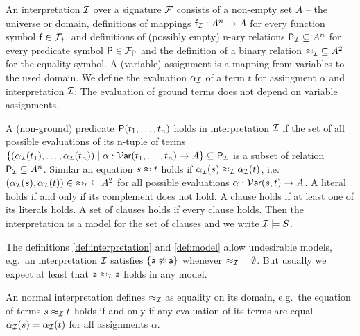 \begin{definition}\label{def:interpretation}
	An {\myem interpretation} ${\mathcal I}$ over a signature ${\mathcal F}$ consists of a
	non-empty set $A$ -- the {\myem universe} or {\myem domain},
	definitions of mappings ${\mathsf f}_{\mathcal I}: A^n\rightarrow A$ for every function symbol ${\mathsf f}\in{{\mathcal F}_{\mathsf f}}$, 
	and definitions of (possibly empty) n-ary relations 
	 ${{\mathsf P}_{\mathcal I}}\subseteq A^n$ for every predicate symbol ${\mathsf P}\in{{\mathcal F}_{\mathsf P}}$
	 and the definition of a binary relation ${\approx_{\mathcal I}}\subseteq A^2$ for the equality symbol.
	 A (variable) {\myem assignment} is a mapping from variables to the used domain.
	 We define the {\myem evaluation} $\alpha_{\mathcal I}$ of a term $t$ 
	 for assingment $\alpha$ and interpretation ${\mathcal I}$:
The evaluation of ground terms does not depend on variable assignments.
\end{definition}
\begin{definition}\label{def:model}
	A (non-ground) predicate ${\mathsf P}(t_1,\ldots,t_n)$ 
	{\myem holds} in interpretation ${\mathcal I}$  
	if the set of all possible evaluations of its n-tuple of terms 
	$\{ 
	(\alpha_{\mathcal I}({t_1}),\ldots,\alpha_{\mathcal I}({t_n}))
	\mid \alpha : \operatorname{\mathcal{V}\mathsf{ar}}(t_1,\ldots,t_n) \to A \} \subseteq{\mathsf P}_{\mathcal I}$
	is a subset of relation ${\mathsf P}_{\mathcal I}\subseteq A^n$.
	Similar an equation $s\approx t$ 
	holds if $\alpha_{\mathcal I}(s) \approx_{\mathcal I} \alpha_{\mathcal I}(t)$,
	i.e.~$(\alpha_{\mathcal I}(s),\alpha_{\mathcal I}(t)) \in {\approx_{\mathcal I}} \subseteq A^2$
	for all possible evaluations $\alpha: \operatorname{\mathcal{V}\mathsf{ar}}(s,t) \to A$. 
	A literal holds
	if and only if its complement does not hold.
	A clause holds if at least one of its literals holds.
	A set of clauses holds if every clause holds.
	Then the interpretation is a model for the set of clauses and 
	we write ${\mathcal I}\models S$. 
\end{definition}

\begin{example}The definitions \ref{def:interpretation} and \ref{def:model} 
	allow undesirable models, 
	e.g.~an interpretation ${\mathcal I}$ satisfies $\{ {\mathsf a}\not\approx{\mathsf a} \}$ 
		whenever ${\approx_{\mathcal I}} = \emptyset$.
	But usually we expect at least that ${\mathsf a}\approx_{\mathcal I}{\mathsf a}$ holds in any model.
\end{example}

\begin{definition}
	An {\myem normal} interpretation defines $\approx_{\mathcal I}$ as equality on its domain,
	e.g.~the equation of terms $s \approx_{\mathcal I} t$ holds if and only 
	if any evaluation of its terms are equal $\alpha_{\mathcal I}(s) = \alpha_{\mathcal I}(t)$ 
	for all assignments $\alpha$.
\end{definition}

